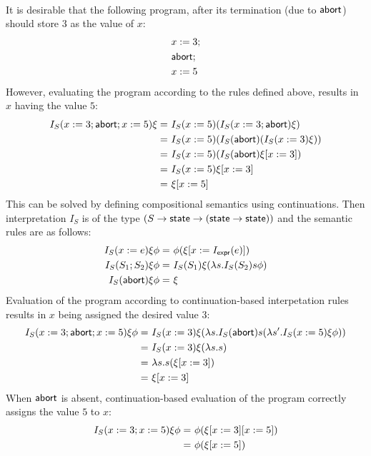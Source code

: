 \begin{example}
\begin{align}
\end{align}
It is desirable that the following program, after its termination (due to $\mathsf{abort}$) should store $3$ as the value of $x$:
\begin{align*}
& x:= 3; \notag \\
& \mathsf{abort}; \notag \\
& x:= 5 \notag
\end{align*}
However, evaluating the program according to the rules defined above, 
results in $x$ having the value $5$:
\begin{align}
I_S(x:=3;\mathsf{abort}; x:=5)\xi  = \ & I_S(x:=5)(I_S(x:=3; \mathsf{abort})\xi ) \notag \\
= \ & I_S(x:=5)(I_S(\mathsf{abort})(I_S(x:=3) \xi)) \notag \\
= \ & I_S(x:=5)(I_S(\mathsf{abort}) \xi [ x:=3 ] )  \notag \\
= \ & I_S(x:=5) \xi [  x:=3 ] \notag \\
= \ & \xi [ x:=5] \notag
\end{align}
This can be solved by defining compositional semantics using continuations. Then interpretation $I_S$ is of the type $(S \rightarrow \mathsf{state} \rightarrow (\mathsf{state} \rightarrow \mathsf{state}))$ and the semantic rules are as follows:
\begin{align}
I_{S}(x:=e) \xi \phi = \ & \phi(\xi [ x:=I_{\mathsf{expr}}(e)]) \notag \\
I_{S}(S_1;S_2)\xi \phi = \ &  I_S(S_1)\xi(\lambda s.I_{S}(S_2)s \phi) \notag \\
I_{S}(\mathsf{abort}) \xi \phi = \ &\xi \notag
\end{align}
Evaluation of the program according to continuation-based interpetation rules results in $x$ being assigned the desired value $3$:
\begin{align}
I_{S}(x:=3; \mathsf{abort}; x:=5) \xi \phi  = \ & I_{S}(x:=3) \xi ( \lambda s. I_{S}(\mathsf{abort}) s ( \lambda s'. I_{S}(x:=5) \xi \phi )) \notag \\
= \ & I_{S}(x:=3) \xi (\lambda s.s) \notag \\
= \ & \lambda s.s (\xi [x:=3] )  \notag \\
= \ & \xi [x:=3] \notag
\end{align}
When $\mathsf{abort}$ is absent, continuation-based evaluation of the program  correctly assigns the value $5$ to $x$:
\begin{align}
I_{S}(x:=3; x:=5) \xi \phi = \ & \phi(\xi[x:=3][x:=5]) \notag \\
= \ & \phi (\xi [x:=5]) \notag
\end{align}
\end{example}

